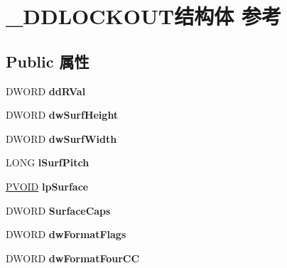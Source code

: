 \hypertarget{struct___d_d_l_o_c_k_o_u_t}{}\section{\+\_\+\+D\+D\+L\+O\+C\+K\+O\+U\+T结构体 参考}
\label{struct___d_d_l_o_c_k_o_u_t}
\subsection*{Public 属性}
\begin{DoxyCompactItemize}
\item 
\mbox{\label{struct___d_d_l_o_c_k_o_u_t_a7f8830bbd51b6d551927473e3c27b504}} 
D\+W\+O\+RD {\bfseries dd\+R\+Val}
\item 
\mbox{\label{struct___d_d_l_o_c_k_o_u_t_afd63af3643f98526da794fe40381c16b}} 
D\+W\+O\+RD {\bfseries dw\+Surf\+Height}
\item 
\mbox{\label{struct___d_d_l_o_c_k_o_u_t_a587a2766fa5669d6444bad0f2854d60f}} 
D\+W\+O\+RD {\bfseries dw\+Surf\+Width}
\item 
\mbox{\label{struct___d_d_l_o_c_k_o_u_t_a37389dd5a264b58168078c5a3438321d}} 
L\+O\+NG {\bfseries l\+Surf\+Pitch}
\item 
\mbox{\label{struct___d_d_l_o_c_k_o_u_t_a70f29faef55e8cfb6a5548d04412e4c4}} 
\hyperlink{interfacevoid}{P\+V\+O\+ID} {\bfseries lp\+Surface}
\item 
\mbox{\label{struct___d_d_l_o_c_k_o_u_t_ad8df79e0e22610ae0c76137fc608ba13}} 
D\+W\+O\+RD {\bfseries Surface\+Caps}
\item 
\mbox{\label{struct___d_d_l_o_c_k_o_u_t_ac9cb2e3983cb0ac19cc4829abaa895ca}} 
D\+W\+O\+RD {\bfseries dw\+Format\+Flags}
\item 
\mbox{\label{struct___d_d_l_o_c_k_o_u_t_a87d5e6788b89f6384f9bd6a929dd4232}} 
D\+W\+O\+RD {\bfseries dw\+Format\+Four\+CC}
\item 
\mbox{\label{struct___d_d_l_o_c_k_o_u_t_a60e1e028678dcdc9a2c6de5ed75686f4}} 

\end{DoxyCompactItemize}
